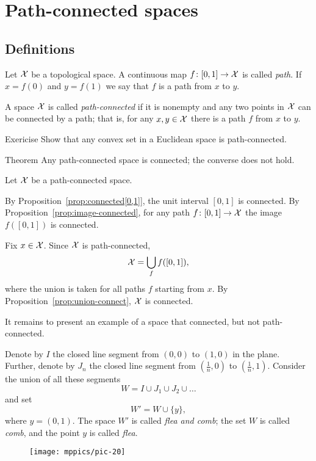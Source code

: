 \chapter{Path-connected spaces}

\section{Definitions}

Let $\mathcal{X}$ be a topological space.
A continuous map $f\colon[0,1]\to \mathcal{X}$ is called \emph{path}.
If $x=f(0)$ and $y=f(1)$ we say that $f$ is a path from $x$ to $y$.

A space $\mathcal{X}$ is called \emph{path-connected} if it is nonempty and any two points in $\mathcal{X}$ can be connected by a path;
that is, for any $x,y\in \mathcal{X}$ there is a path $f$ from $x$ to $y$.

\begin{thm}{Exericise}
Show that any convex set in a Euclidean space is path-connected. 
\end{thm}

\begin{thm}{Theorem}\label{thm:conncted/path-connected}
Any path-connected space is connected;
the converse does not hold.
\end{thm}

Let $\mathcal{X}$ be a path-connected space.

By Proposition~\ref{prop:connected[0,1]}, the unit interval $[0,1]$ is connected.
By Proposition~\ref{prop:image-connected}, for any path $f\colon[0,1]\to \mathcal{X}$ the image $f([0,1])$ is connected.

Fix $x\in \mathcal{X}$. 
Since $\mathcal{X}$ is path-connected, 
\[\mathcal{X}=\bigcup_f f([0,1]),\]
where the union is taken for all paths $f$ starting from $x$.
By Proposition~\ref{prop:union-connect}, $\mathcal{X}$ is connected.

It remains to present an example of a space that connected, but not path-connected.

Denote by $I$ the closed line segment from $(0,0)$ to $(1,0)$ in the plane.
Further, denote by $J_n$ the closed line segment from $(\tfrac1n,0)$ to $(\tfrac1n,1)$.
Consider the union of all these segments
\[W=I\cup J_1\cup J_2 \cup \dots\]
and set 
\[W'=W\cup\{y\},\]
where $y=(0,1)$.
The space $W'$ is called \emph{flea and comb};
the set $W$ is called \emph{comb},
and the point $y$ is called \emph{flea}.

\begin{wrapfigure}{r}{33mm}
\vskip-4mm
\texttt{[image: mppics/pic-20]}
\end{wrapfigure}

